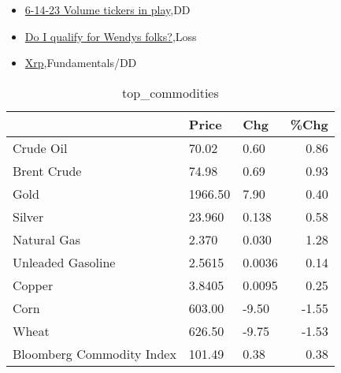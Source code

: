 \documentclass{article}%
\begin{document}
%
\begin{itemize}%
\item%
\href{https://reddit.com/r/wallstreetbets/comments/14966d1/61423\_volume\_tickers\_in\_play/}{6-14-23 Volume tickers in play},DD%
\item%
\href{https://reddit.com/r/wallstreetbets/comments/1495h35/do\_i\_qualify\_for\_wendys\_folks/}{Do I qualify for Wendys folks?},Loss%
\item%
\href{https://reddit.com/r/StockMarket/comments/14915qz/xrp/}{Xrp},Fundamentals/DD%
\end{itemize}%


\begin{table}[htbp]%
\caption{top\_commodities}%
\centering%
\begin{adjustbox}{width=1\textwidth}%
\begin{tabular}{lllr}
\toprule
                          &   Price &    Chg &  \%Chg \\
\midrule
               Crude Oil  &   70.02 &   0.60 &  0.86 \\
             Brent Crude  &   74.98 &   0.69 &  0.93 \\
                    Gold  & 1966.50 &   7.90 &  0.40 \\
                  Silver  &  23.960 &  0.138 &  0.58 \\
             Natural Gas  &   2.370 &  0.030 &  1.28 \\
       Unleaded Gasoline  &  2.5615 & 0.0036 &  0.14 \\
                  Copper  &  3.8405 & 0.0095 &  0.25 \\
                    Corn  &  603.00 &  -9.50 & -1.55 \\
                   Wheat  &  626.50 &  -9.75 & -1.53 \\
Bloomberg Commodity Index &  101.49 &   0.38 &  0.38 \\
\bottomrule
\end{tabular}
%
\end{adjustbox}%
\end{table}

%
\end{document}

